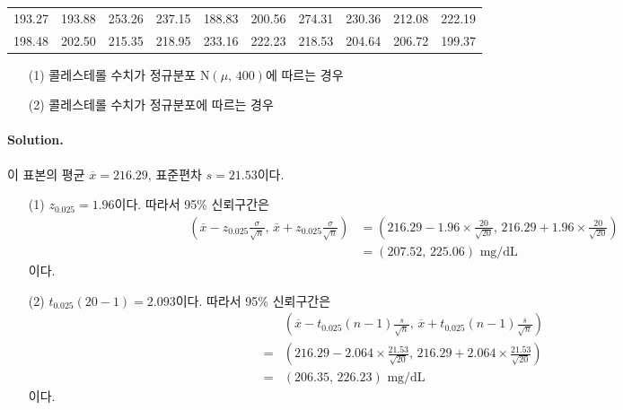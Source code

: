 \begin{center}
    \begin{tabular}{cccccccccc}
        \hline
        193.27 & 193.88 & 253.26 & 237.15 & 188.83 & 200.56 & 274.31 & 230.36 & 212.08 & 222.19 \\
        198.48 & 202.50 & 215.35 & 218.95 & 233.16 & 222.23 & 218.53 & 204.64 & 206.72 & 199.37 \\
        \hline
    \end{tabular}
\end{center}

\begin{itemize}
    \item[(1)] 콜레스테롤 수치가 정규분포 $\mathrm{N}\left(\mu,\,400\right)$에 따르는 경우
    \item[(2)] 콜레스테롤 수치가 정규분포에 따르는 경우 
\end{itemize}

\paragraph{Solution.} 이 표본의 평균 $\overline{x}=216.29$, 표준편차 $s=21.53$이다.

\begin{itemize}
    \item[(1)] {
        $z_{0.025}=1.96$이다. 따라서 95\% 신뢰구간은
        \begin{align*}
            \left(\overline{x}-z_{0.025}\frac{\sigma}{\sqrt{n}},\,\overline{x}+z_{0.025}\frac{\sigma}{\sqrt{n}}\right)
            &= \left(216.29-1.96\times\frac{20}{\sqrt{20}},\,216.29+1.96\times\frac{20}{\sqrt{20}}\right) \\
            &= \left(207.52,\,225.06\right)\mbox{ mg/dL}
        \end{align*}
        이다.
    }
    \item[(2)] {
        $t_{0.025}\left(20-1\right)=2.093$이다. 따라서 95\% 신뢰구간은
        \begin{align*}
            & \left(\overline{x}-t_{0.025}\left(n-1\right)\frac{s}{\sqrt{n}},\,\overline{x}+t_{0.025}\left(n-1\right)\frac{s}{\sqrt{n}}\right) \\
            =& \left(216.29-2.064\times\frac{21.53}{\sqrt{20}},\,216.29+2.064\times\frac{21.53}{\sqrt{20}}\right) \\
            =& \left(206.35,\,226.23\right)\mbox{ mg/dL}
        \end{align*}
        이다.
    }
\end{itemize}

